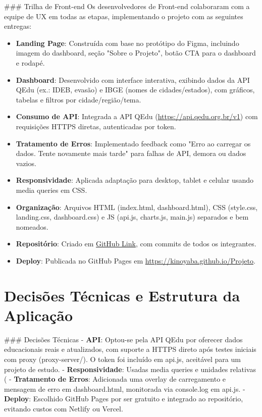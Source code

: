 \documentclass[a4paper,12pt]{article}
\begin{document}
### Trilha de Front-end
Os desenvolvedores de Front-end colaboraram com a equipe de UX em todas as etapas, implementando o projeto com as seguintes entregas:

\begin{itemize}
    \item \textbf{Landing Page}: Construída com base no protótipo do Figma, incluindo imagem do dashboard, seção "Sobre o Projeto", botão CTA para o dashboard e rodapé.
    \item \textbf{Dashboard}: Desenvolvido com interface interativa, exibindo dados da API QEdu (ex.: IDEB, evasão) e IBGE (nomes de cidades/estados), com gráficos, tabelas e filtros por cidade/região/tema.
    \item \textbf{Consumo de API}: Integrada a API QEdu (\url{https://api.qedu.org.br/v1}) com requisições HTTPS diretas, autenticadas por token.
    \item \textbf{Tratamento de Erros}: Implementado feedback como "Erro ao carregar os dados. Tente novamente mais tarde" para falhas de API, demora ou dados vazios.
    \item \textbf{Responsividade}: Aplicada adaptação para desktop, tablet e celular usando media queries em CSS.
    \item \textbf{Organização}: Arquivos HTML (index.html, dashboard.html), CSS (style.css, landing.css, dashboard.css) e JS (api.js, charts.js, main.js) separados e bem nomeados.
    \item \textbf{Repositório}: Criado em \href{https://github.com/Kinoyaba/projeto}{GitHub Link}, com commits de todos os integrantes.
    \item \textbf{Deploy}: Publicada no GitHub Pages em \url{https://kinoyaba.github.io/Projeto}.
\end{itemize}

\section{Decisões Técnicas e Estrutura da Aplicação}
### Decisões Técnicas
- \textbf{API}: Optou-se pela API QEdu por oferecer dados educacionais reais e atualizados, com suporte a HTTPS direto após testes iniciais com proxy (proxy-server/). O token foi incluído em api.js, aceitável para um projeto de estudo.
- \textbf{Responsividade}: Usadas media queries e unidades relativas (%
- \textbf{Tratamento de Erros}: Adicionada uma overlay de carregamento e mensagem de erro em dashboard.html, monitorada via console.log em api.js.
- \textbf{Deploy}: Escolhido GitHub Pages por ser gratuito e integrado ao repositório, evitando custos com Netlify ou Vercel.
\end{document}
